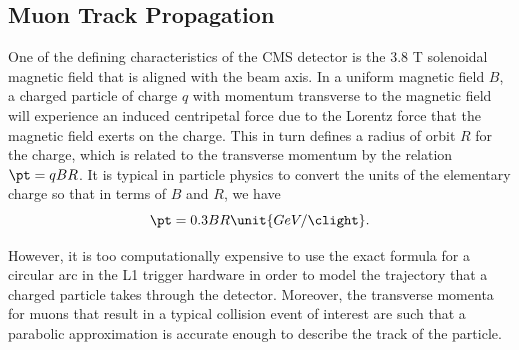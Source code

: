 \subsection{Muon Track Propagation}
\label{subsec:prop}

One of the defining characteristics of the CMS detector is the 3.8 T solenoidal magnetic field that is aligned with the beam axis.
In a uniform magnetic field $B$, a charged particle of charge $q$ with momentum transverse to the magnetic field \pt will experience an induced centripetal force due to the Lorentz force that the magnetic field exerts on the charge.
This in turn defines a radius of orbit $R$ for the charge, which is related to the transverse momentum \pt by the relation $\pt=qBR$. It is typical in particle physics to convert the units of the elementary charge so that in terms of $B$ and $R$, we have
\begin{equation}\label{eq:pt}
  \pt=0.3BR\unit{GeV/\clight}.
\end{equation}

However, it is too computationally expensive to use the exact formula for a circular arc in the L1 trigger hardware in order to model the trajectory that a charged particle takes through the detector.
Moreover, the transverse momenta for muons that result in a typical collision event of interest are such that a parabolic approximation is accurate enough to describe the track of the particle.

